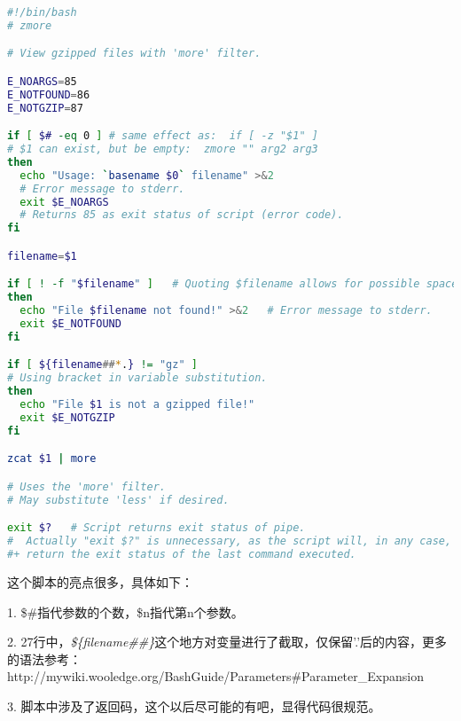 \documentclass[12pt]{article}  %
\begin{document}
\begin{lstlisting}[language=sh]
#!/bin/bash
# zmore

# View gzipped files with 'more' filter.

E_NOARGS=85
E_NOTFOUND=86
E_NOTGZIP=87

if [ $# -eq 0 ] # same effect as:  if [ -z "$1" ]
# $1 can exist, but be empty:  zmore "" arg2 arg3
then
  echo "Usage: `basename $0` filename" >&2
  # Error message to stderr.
  exit $E_NOARGS
  # Returns 85 as exit status of script (error code).
fi  

filename=$1

if [ ! -f "$filename" ]   # Quoting $filename allows for possible spaces.
then
  echo "File $filename not found!" >&2   # Error message to stderr.
  exit $E_NOTFOUND
fi  

if [ ${filename##*.} != "gz" ]
# Using bracket in variable substitution.
then
  echo "File $1 is not a gzipped file!"
  exit $E_NOTGZIP
fi  

zcat $1 | more

# Uses the 'more' filter.
# May substitute 'less' if desired.

exit $?   # Script returns exit status of pipe.
#  Actually "exit $?" is unnecessary, as the script will, in any case,
#+ return the exit status of the last command executed.
\end{lstlisting}\par
这个脚本的亮点很多，具体如下：\par
1. \$\#指代参数的个数，\$n指代第n个参数。\par
2. 27行中，\emph{\$\{filename##\*\.\}}这个地方对变量进行了截取，仅保留'.'后的内容，更多的语法参考：http://mywiki.wooledge.org/BashGuide/Parameters#Parameter\_Expansion\par
3. 脚本中涉及了返回码，这个以后尽可能的有吧，显得代码很规范。\par
\begin{lstlisting}[language=sh]

\end{lstlisting}
\begin{lstlisting}[language=sh]

\end{lstlisting}
\begin{lstlisting}[language=sh]

\end{lstlisting}
\end{document}
